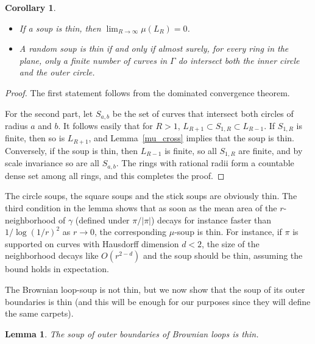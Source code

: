 \documentclass[11pt]{article}
\newtheorem {lemma} [Theorem]    {Lemma}
\newtheorem {corollary}  [Theorem]    {Corollary}
\begin{document}
\begin{corollary}\label{thin_large_R}
\begin{itemize}
\item[(i)] If a soup is thin, then $\lim_{R \to \infty} \mu(L_R) = 0$.
\item[(ii)]
A random soup is thin if and only if almost surely, for every ring in the plane, 
only a finite number of curves in $\Gamma$ do intersect 
both the inner circle and the outer circle.
\end{itemize}
\end{corollary}

\begin {proof}
The first statement follows from the dominated convergence theorem.

For the second part, let $S_{a,b}$ be the set
of curves that intersect both circles of radius $a$ and $b$.
It follows easily that for $R>1$, $L_{R+1} \subset S_{1,R} \subset L_{R-1}$.
If $S_{1,R}$ is finite, then so is $L_{R+1}$, and Lemma~\ref{mu_cross}
implies that the soup is thin. Conversely, if the soup is thin,
then $L_{R-1}$ is finite, so all $S_{1,R}$ are finite, and by scale
invariance so are all $S_{a,b}$.
The rings with rational radii form a countable dense set among all rings,
and this completes the proof.
\end {proof}


The circle soups, the square soups and the stick soups are obviously thin. 
The third condition in the lemma shows that as soon as the mean area of the 
$r$-neighborhood of $\gamma$ (defined under $\pi / |\pi|$) 
decays for instance faster than $1/\log (1/r)^2$ as $r \to 0$,  the 
corresponding $\mu$-soup is thin.
For instance, if $\pi$ is supported on curves with Hausdorff dimension $d<2$,
the size of the neighborhood decays like $O(r^{2-d})$ and the soup should be 
thin, assuming the bound holds in expectation.

The Brownian loop-soup is not thin, but we now show that the soup 
of its outer boundaries is thin 
(and this will be enough for our purposes since they will define the same carpets).

\begin {lemma}
The soup of outer boundaries of Brownian loops is thin.
\end {lemma}
\end{document}
